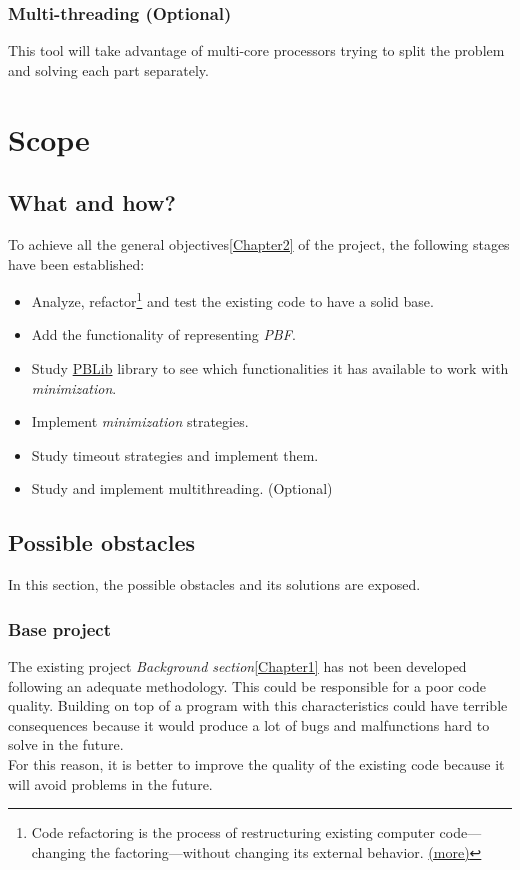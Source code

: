 \subsubsection{Multi-threading (Optional)}
This tool will take advantage of multi-core processors trying to split the problem and solving each part separately.

\section{Scope}
\subsection{What and how?}

To achieve all the general objectives\ref{Chapter2} of the project, the following stages have been established:
\begin{itemize}
	\item Analyze, refactor\footnote{Code refactoring is the process of restructuring existing computer code—changing the factoring—without changing its external behavior. \href{https://en.wikipedia.org/wiki/Code_refactoring}{(more)}} and test the existing code to have a solid base. 
	\item Add the functionality of representing \emph{PBF}.
	\item Study \href{http://tools.computational-logic.org/content/pblib.php}{PBLib} library to see which functionalities it has available to work with \emph{minimization}.
	\item Implement \emph{minimization} strategies.
	\item Study timeout strategies and implement them.
	\item Study and implement multithreading. (Optional)
\end{itemize}

\subsection{Possible obstacles}

In this section, the possible obstacles and its solutions are exposed.

\subsubsection{Base project}
The existing project \emph{Background section}\ref{Chapter1} has not been developed following an adequate methodology. This could be responsible for a poor code quality. Building on top of a program with this characteristics could have terrible consequences because it would produce a lot of bugs and malfunctions hard to solve in the future. \\
For this reason, it is better to improve the quality of the existing code because it will avoid problems in the future.

